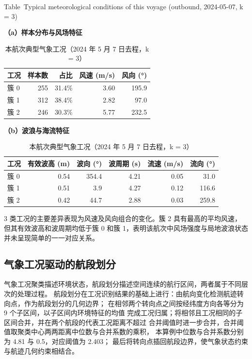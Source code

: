 \documentclass[UTF8,a4paper,twoside,zihao=5,fontset=windows]{ctexart}
\begin{document}
\begin{table}[htbp]
\centering
\small
\setlength{\tabcolsep}{4pt}
\renewcommand{\arraystretch}{1.4}
\caption{本航次典型气象工况（2024 年 5 月 7 日去程，k = 3）}
{\small Table~\thetable\quad Typical meteorological conditions of this voyage (outbound, 2024-05-07, k = 3)\par}
\smallskip
\label{tab:meteo_conditions}
\textbf{（a）样本分布与风场特征}\par\smallskip
\begin{tabular}{@{}lrrrr@{}}
\toprule
工况 & 样本数 & 占比 & 风速 (m/s) & 风向 (°) \\
\midrule
簇 0 & 255 & 31.4\% & 3.60 & 195.9 \\
簇 1 & 312 & 38.4\% & 2.82 & 97.0 \\
簇 2 & 246 & 30.3\% & 5.77 & 232.5 \\
\bottomrule
\end{tabular}\par\medskip\textbf{（b）波浪与海流特征}\par\smallskip
\begin{tabular}{@{}lrrrrr@{}}
\toprule
工况 & 有效波高 (m) & 波向 (°) & 波周期 (s) & 流速 (m/s) & 流向 (°) \\
\midrule
簇 0 & 0.54 & 354.4 & 4.21 & 0.05 & 31.0 \\
簇 1 & 0.51 & 3.9 & 4.27 & 0.12 & 116.6 \\
簇 2 & 0.42 & 44.7 & 2.88 & 0.03 & 259.8 \\
\bottomrule
\end{tabular}
\end{table}
\FloatBarrier

3 类工况的主要差异表现为风速及风向组合的变化。簇 2 具有最高的平均风速，
但其有效波高和波周期均低于簇 0 和簇 1，表明该航次中风场强度与局地波浪状态
并未呈现简单的一一对应关系。

\subsection{气象工况驱动的航段划分}

气象工况聚类描述环境状态，航段划分描述空间连续的航行区间，两者属于不同层次的处理过程。
航段划分在工况识别结果的基础上进行：由航向变化检测航迹转向点，作为航段划分的几何边界；
在相邻两个转向点之间按经纬度方向各等分为 9 个子区间，以子区间内环境特征的均值
完成工况归属；将相邻且工况相同的子区间合并，并在两个航段的代表工况距离不超过
合并阈值时进一步合并，合并阈值取聚类中心两两距离中位数与合并系数的乘积，
本算例中位数与合并系数分别为 4.81 与 0.5，对应阈值为 2.403；
最后将转向点插回航段边界，使气象状态约束与航迹几何约束相结合。
\end{document}
